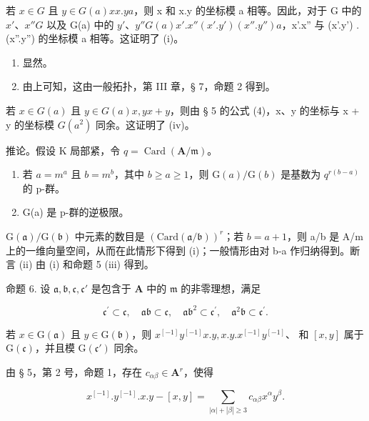 若 \(x \in G\) 且 \(y \in G(a)\)\(x\)\(x.y\)\(a\)，则 x 和 x.y 的坐标模 a 相等。因此，对于 G 中的 \(x'\)、\(x''\)\(G\) 以及 G(a) 中的 \(y'\)、\(y''\)\(G(a)\)\(x'.x''\)\((x'.y')\)\((x''.y'')\)\(a\)，x'.x'' 与 (x'.y') . (x''.y'') 的坐标模 a 相等。这证明了 (i)。

\begin{enumerate}
\def\labelenumi{(\roman{enumi})}
\setcounter{enumi}{1}
\item
  显然。
\item
  由上可知，这由一般拓扑，第 III 章，§ 7，命题 2 得到。
\end{enumerate}

若 \(x \in G(a)\) 且 \(y \in G(a)\)\(x, y\)\(x + y\)，则由 § 5 的公式 (4)，x、y 的坐标与 x + y 的坐标模 \(G(a^2)\) 同余。这证明了 (iv)。

推论。假设 K 局部紧，令 \(q = \operatorname{Card}(\mathbf{A} / \mathfrak{m})\)。

\begin{enumerate}
\def\labelenumi{(\roman{enumi})}
\item
  若 \(a = m^{a}\) 且 \(b = m^{b}\)，其中 \(b \geqslant a \geqslant 1\)，则 \(\mathrm{G}(a)/\mathrm{G}(b)\) 是基数为 \(q^{r(b-a)}\) 的 p-群。
\item
  G(a) 是 p-群的逆极限。
\end{enumerate}

\(\mathrm{G}(\mathfrak{a})/\mathrm{G}(\mathfrak{b})\) 中元素的数目是 \((\mathrm{Card}(\mathfrak{a}/\mathfrak{b}))^{r}\)；若 \(b=a+1\)，则 a/b 是 A/m 上的一维向量空间，从而在此情形下得到 (i)；一般情形由对 b-a 作归纳得到。断言 (ii) 由 (i) 和命题 5 (iii) 得到。

命题 6. 设 \(\mathfrak{a}, \mathfrak{b}, \mathfrak{c}, \mathfrak{c}'\) 是包含于 \(\mathbf{A}\) 中的 \(\mathfrak{m}\) 的非零理想，满足

\[
\mathfrak {c} ^ {\prime} \subset \mathfrak {c}, \quad \mathfrak {a b} \subset \mathfrak {c}, \quad \mathfrak {a b} ^ {2} \subset \mathfrak {c} ^ {\prime}, \quad \mathfrak {a} ^ {2} \mathfrak {b} \subset \mathfrak {c} ^ {\prime}.
\]

若 \(x \in \mathrm{G}(\mathfrak{a})\) 且 \(y \in \mathrm{G}(\mathfrak{b})\)，则 \(x^{[-1]}y^{[-1]}x.y, x.y.x^{[-1]}y^{[-1]}\)、 和 \([x,y]\) 属于 \(\mathrm{G}(\mathfrak{c})\)，并且模 \(\mathrm{G}(\mathfrak{c}')\) 同余。

由 § 5，第 2 号，命题 1，存在 \(c_{\alpha \beta} \in \mathbf{A}^r\)，使得

\[
x ^ {[ - 1 ]}. y ^ {[ - 1 ]}. x. y - [ x, y ] = \sum_ {| \alpha | + | \beta | \geqslant 3} c _ {\alpha \beta} x ^ {\alpha} y ^ {\beta}.
\]

